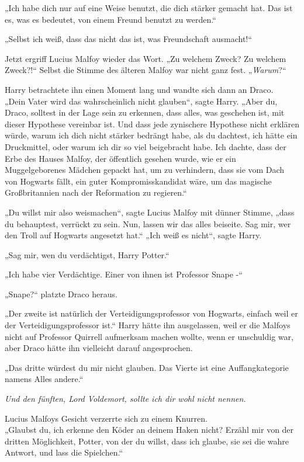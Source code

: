 {„Ich habe dich nur auf eine Weise benutzt, die dich stärker gemacht hat. Das ist es, was es bedeutet, von einem Freund benutzt zu werden.“

„Selbst ich weiß, dass das nicht das ist, was Freundschaft ausmacht!“

Jetzt ergriff Lucius Malfoy wieder das Wort. „Zu welchem Zweck? Zu welchem Zweck?!“ Selbst die Stimme des älteren Malfoy war nicht ganz fest. „\emph{Warum}?“

Harry betrachtete ihn einen Moment lang und wandte sich dann an Draco.\\ „Dein Vater wird das wahrscheinlich nicht glauben“, sagte Harry. „Aber du, Draco, solltest in der Lage sein zu erkennen, dass alles, was geschehen ist, mit dieser Hypothese vereinbar ist. Und dass jede zynischere Hypothese nicht erklären würde, warum ich dich nicht stärker bedrängt habe, als du dachtest, ich hätte ein Druckmittel, oder warum ich dir so viel beigebracht habe. Ich dachte, dass der Erbe des Hauses Malfoy, der öffentlich gesehen wurde, wie er ein Muggelgeborenes Mädchen gepackt hat, um zu verhindern, dass sie vom Dach von Hogwarts fällt, ein guter Kompromisskandidat wäre, um das magische Großbritannien nach der Reformation zu regieren.“

„Du willst mir also weismachen“, sagte Lucius Malfoy mit dünner Stimme, „dass du behauptest, verrückt zu sein. Nun, lassen wir das alles beiseite. Sag mir, wer den Troll auf Hogwarts angesetzt hat.“ „Ich weiß es nicht“, sagte Harry.

„Sag mir, wen du verdächtigst, Harry Potter.“

„Ich habe vier Verdächtige. Einer von ihnen ist Professor Snape -“

„Snape?“ platzte Draco heraus.

„Der zweite ist natürlich der Verteidigungsprofessor von Hogwarts, einfach weil er der Verteidigungsprofessor ist.“ Harry hätte ihn ausgelassen, weil er die Malfoys nicht auf Professor Quirrell aufmerksam machen wollte, wenn er unschuldig war, aber Draco hätte ihn vielleicht darauf angesprochen.

„Das dritte würdest du mir nicht glauben. Das Vierte ist eine Auffangkategorie namens Alles andere.“

\emph{Und den fünften, Lord Voldemort, sollte ich dir wohl nicht nennen.}

Lucius Malfoys Gesicht verzerrte sich zu einem Knurren.\\ „Glaubst du, ich erkenne den Köder an deinem Haken nicht? Erzähl mir von der dritten Möglichkeit, Potter, von der du willst, dass ich glaube, sie sei die wahre Antwort, und lass die Spielchen.“

}
